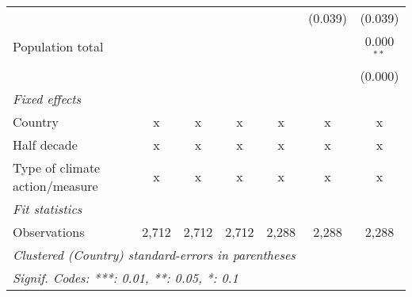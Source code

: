 \begin{tabular}{lcccccc}
                                                     &                &               &               &               & (0.039)       & (0.039)\\   
   Population total                                  &                &               &               &               &               & 0.000$^{**}$\\   
                                                     &                &               &               &               &               & (0.000)\\   
   \emph{Fixed effects}\\
   Country                                           & x              & x             & x             & x             & x             & x\\  
   Half decade                                       & x              & x             & x             & x             & x             & x\\  
   Type of climate action/measure                    & x              & x             & x             & x             & x             & x\\  
   \midrule \emph{Fit statistics}\\
   Observations                                      & 2,712          & 2,712         & 2,712         & 2,288         & 2,288         & 2,288\\  
   \midrule
   \multicolumn{7}{l}{\emph{Clustered (Country) standard-errors in parentheses}}\\
   \multicolumn{7}{l}{\emph{Signif. Codes: ***: 0.01, **: 0.05, *: 0.1}}\\
\end{tabular}
\par\endgroup


